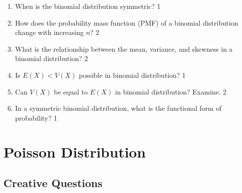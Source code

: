 \documentclass[a4paper,oneside, margin=1.4in]{book}
\begin{document}
\begin{enumerate}
\item When is the binomial distribution symmetric? \hfill 1

\item How does the probability mass function (PMF) of a binomial distribution change with increasing \( n \)? \hfill 2

\item What is the relationship between the mean, variance, and skewness in a binomial distribution? \hfill 2

\item Is $E(X) < V(X)$ possible in binomial distribution? \hfill 1

\item Can $V(X)$ be equal to $E(X)$ in binomial distribution? Examine. \hfill 2

\item In a symmetric binomial distribution, what is the functional form of probability? \hfill 1


 \end{enumerate}

\chapter{Poisson Distribution} 
\section{Creative Questions}
\end{document}
